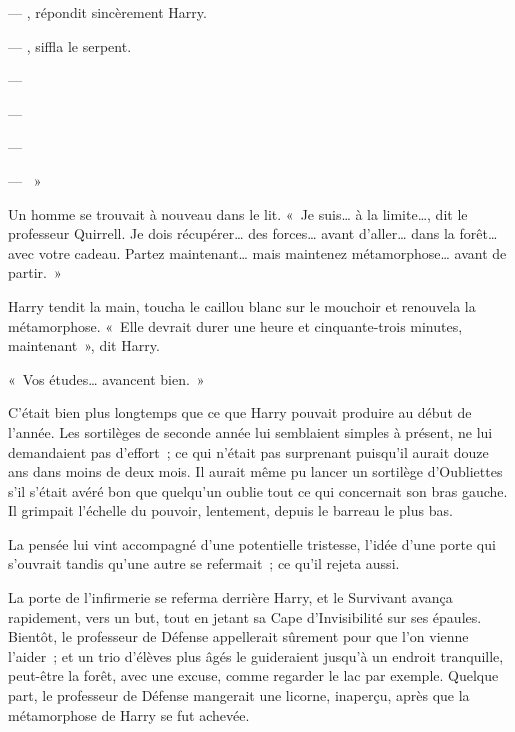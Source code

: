--- , répondit sincèrement Harry.

--- , siffla le serpent. 

--- 

--- 

--- 

--- ~»

Un homme se trouvait à nouveau dans le lit. «~Je suis… à la limite…, dit le professeur Quirrell. Je dois récupérer… des forces… avant d'aller… dans la forêt… avec votre cadeau. Partez maintenant… mais maintenez métamorphose… avant de partir.~»

Harry tendit la main, toucha le caillou blanc sur le mouchoir et renouvela la métamorphose. «~Elle devrait durer une heure et cinquante-trois minutes, maintenant~», dit Harry.

«~Vos études… avancent bien.~»

C'était bien plus longtemps que ce que Harry pouvait produire au début de l'année. Les sortilèges de seconde année lui semblaient simples à présent, ne lui demandaient pas d'effort~; ce qui n'était pas surprenant puisqu'il aurait douze ans dans moins de deux mois. Il aurait même pu lancer un sortilège d'Oubliettes s'il s'était avéré bon que quelqu'un oublie tout ce qui concernait son bras gauche. Il grimpait l'échelle du pouvoir, lentement, depuis le barreau le plus bas.

La pensée lui vint accompagné d'une potentielle tristesse, l'idée d'une porte qui s'ouvrait tandis qu'une autre se refermait~; ce qu'il rejeta aussi.

\later

La porte de l'infirmerie se referma derrière Harry, et le Survivant avança rapidement, vers un but, tout en jetant sa Cape d'Invisibilité sur ses épaules. Bientôt, le professeur de Défense appellerait sûrement pour que l'on vienne l'aider~; et un trio d'élèves plus âgés le guideraient jusqu'à un endroit tranquille, peut-être la forêt, avec une excuse, comme regarder le lac par exemple. Quelque part, le professeur de Défense mangerait une licorne, inaperçu, après que la métamorphose de Harry se fut achevée.

